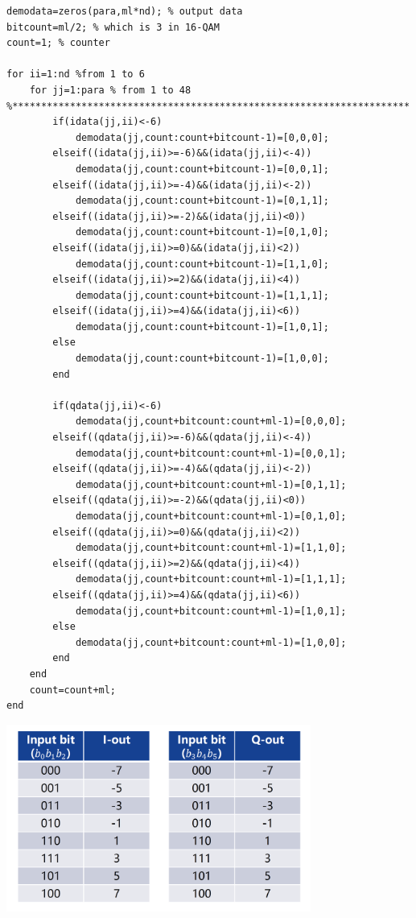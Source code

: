 \documentclass{article}
\begin{document}
\begin{lstlisting}
demodata=zeros(para,ml*nd); % output data
bitcount=ml/2; % which is 3 in 16-QAM
count=1; % counter 

for ii=1:nd %from 1 to 6
	for jj=1:para % from 1 to 48
%*********************************************************************
		if(idata(jj,ii)<-6)
			demodata(jj,count:count+bitcount-1)=[0,0,0];
		elseif((idata(jj,ii)>=-6)&&(idata(jj,ii)<-4))
			demodata(jj,count:count+bitcount-1)=[0,0,1];
		elseif((idata(jj,ii)>=-4)&&(idata(jj,ii)<-2))
			demodata(jj,count:count+bitcount-1)=[0,1,1];
		elseif((idata(jj,ii)>=-2)&&(idata(jj,ii)<0))
			demodata(jj,count:count+bitcount-1)=[0,1,0];
		elseif((idata(jj,ii)>=0)&&(idata(jj,ii)<2))
			demodata(jj,count:count+bitcount-1)=[1,1,0];
		elseif((idata(jj,ii)>=2)&&(idata(jj,ii)<4))
			demodata(jj,count:count+bitcount-1)=[1,1,1];
		elseif((idata(jj,ii)>=4)&&(idata(jj,ii)<6))
			demodata(jj,count:count+bitcount-1)=[1,0,1];
		else
			demodata(jj,count:count+bitcount-1)=[1,0,0];
		end
		
		if(qdata(jj,ii)<-6)
			demodata(jj,count+bitcount:count+ml-1)=[0,0,0];
		elseif((qdata(jj,ii)>=-6)&&(qdata(jj,ii)<-4))
			demodata(jj,count+bitcount:count+ml-1)=[0,0,1];
		elseif((qdata(jj,ii)>=-4)&&(qdata(jj,ii)<-2))
			demodata(jj,count+bitcount:count+ml-1)=[0,1,1];
		elseif((qdata(jj,ii)>=-2)&&(qdata(jj,ii)<0))
			demodata(jj,count+bitcount:count+ml-1)=[0,1,0];
		elseif((qdata(jj,ii)>=0)&&(qdata(jj,ii)<2))
			demodata(jj,count+bitcount:count+ml-1)=[1,1,0];
		elseif((qdata(jj,ii)>=2)&&(qdata(jj,ii)<4))
			demodata(jj,count+bitcount:count+ml-1)=[1,1,1];
		elseif((qdata(jj,ii)>=4)&&(qdata(jj,ii)<6))
			demodata(jj,count+bitcount:count+ml-1)=[1,0,1];
		else
			demodata(jj,count+bitcount:count+ml-1)=[1,0,0];
		end
	end
	count=count+ml;
end
\end{lstlisting}

\begin{center}
\includegraphics[width=10cm]{000}
\end{center}
\end{document}
